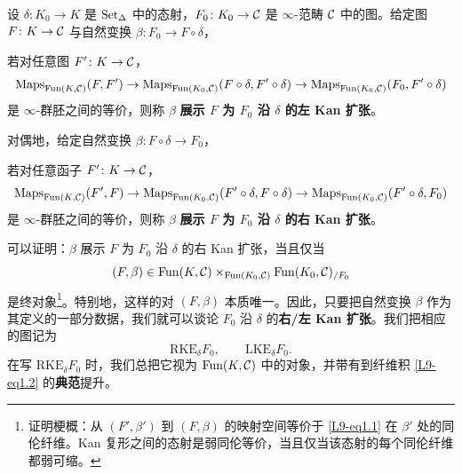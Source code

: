 \begin{definition}\label{L9-1.2}
设 $\delta\colon K_0\to K$ 是 $\operatorname{Set}_\Delta$ 中的态射，$F_0\colon K_0\to\mathcal{C}$ 是 $\infty$-范畴 $\mathcal{C}$ 中的图。给定图 $F\colon K\to\mathcal{C}$ 与自然变换 $\beta\colon F_0\to F\circ\delta$，
\begin{center}
\end{center}
若对任意图 $F'\colon K\to\mathcal{C}$，
\[
\operatorname{Maps}_{\operatorname{Fun}(K,\mathcal{C})}(F,F')\to\operatorname{Maps}_{\operatorname{Fun}(K_0,\mathcal{C})}(F\circ\delta,F'\circ\delta)\to\operatorname{Maps}_{\operatorname{Fun}(K_0,\mathcal{C})}(F_0,F'\circ\delta)
\]
是 $\infty$-群胚之间的等价，则称 $\beta$ \textbf{展示 $F$ 为 $F_0$ 沿 $\delta$ 的左 Kan 扩张}。

对偶地，给定自然变换 $\beta\colon F\circ\delta\to F_0$，
\begin{center}
\end{center}
若对任意函子 $F'\colon K\to\mathcal{C}$，
\begin{equation}\label{L9-eq1.1}
\operatorname{Maps}_{\operatorname{Fun}(K,\mathcal{C})}(F',F)\to\operatorname{Maps}_{\operatorname{Fun}(K_0,\mathcal{C})}(F'\circ\delta,F\circ\delta)\to\operatorname{Maps}_{\operatorname{Fun}(K_0,\mathcal{C})}(F'\circ\delta,F_0)
\end{equation}
是 $\infty$-群胚之间的等价，则称 $\beta$ \textbf{展示 $F$ 为 $F_0$ 沿 $\delta$ 的右 Kan 扩张}。
\end{definition}

\nitem\label{L9-1.3} 可以证明：$\beta$ 展示 $F$ 为 $F_0$ 沿 $\delta$ 的右 Kan 扩张，当且仅当
\begin{equation}\label{L9-eq1.2}
(F,\beta)\in\operatorname{Fun}(K,\mathcal{C})\times_{\operatorname{Fun}(K_0,\mathcal{C})}\operatorname{Fun}(K_0,\mathcal{C})_{/F_0}
\end{equation}
是终对象\footnote{证明梗概：从 $(F',\beta')$ 到 $(F,\beta)$ 的映射空间等价于 \eqref{L9-eq1.1} 在 $\beta'$ 处的同伦纤维。Kan 复形之间的态射是弱同伦等价，当且仅当该态射的每个同伦纤维都弱可缩。}。特别地，这样的对 $(F,\beta)$ 本质唯一。因此，只要把自然变换 $\beta$ 作为其定义的一部分数据，我们就可以谈论 $F_0$ 沿 $\delta$ 的\textbf{右/左 Kan 扩张}。我们把相应的图记为
\[
\mathrm{RKE}_\delta F_0,\qquad \mathrm{LKE}_\delta F_0.
\]
在写 $\mathrm{RKE}_\delta F_0$ 时，我们总把它视为 $\operatorname{Fun}(K,\mathcal{C})$ 中的对象，并带有到纤维积 \eqref{L9-eq1.2} 的\textbf{典范}提升。

